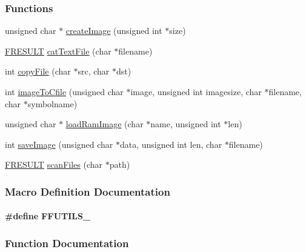 \subsubsection*{Functions}
\begin{DoxyCompactItemize}
\item 
unsigned char $\ast$ \hyperlink{fsutils_8h_af657990c3bb65b3952991fbd104a5e8d}{create\+Image} (unsigned int $\ast$size)
\item 
\hyperlink{ff_8h_a49d0171ecbd362cda5680a0d360db44c}{F\+R\+E\+S\+U\+L\+T} \hyperlink{fsutils_8h_a78db4b553305a7be5e8aa8a6822e69ad}{cat\+Text\+File} (char $\ast$filename)
\item 
int \hyperlink{fsutils_8h_ad5087dce5c2ddc8d9df6a761bc924ee4}{copy\+File} (char $\ast$src, char $\ast$dst)
\item 
int \hyperlink{fsutils_8h_a8ab056df14b6376ec014be9b2f1450e5}{image\+To\+Cfile} (unsigned char $\ast$image, unsigned int imagesize, char $\ast$filename, char $\ast$symbolname)
\item 
unsigned char $\ast$ \hyperlink{fsutils_8h_acece2cee5a5e0b55e2c9471b150c94f4}{load\+Ram\+Image} (char $\ast$name, unsigned int $\ast$len)
\item 
int \hyperlink{fsutils_8h_aa7e2c3eeabf70fdcb65cd67c094b5884}{save\+Image} (unsigned char $\ast$data, unsigned int len, char $\ast$filename)
\item 
\hyperlink{ff_8h_a49d0171ecbd362cda5680a0d360db44c}{F\+R\+E\+S\+U\+L\+T} \hyperlink{fsutils_8h_a7ed47006993e0f16e2f77f981a1eed80}{scan\+Files} (char $\ast$path)
\end{DoxyCompactItemize}


\subsubsection{Macro Definition Documentation}
\paragraph[{F\+F\+U\+T\+I\+L\+S\+\_\+}]{\setlength{\rightskip}{0pt plus 5cm}\#define F\+F\+U\+T\+I\+L\+S\+\_\+}\label{fsutils_8h_ae0f9f379fdea300d0168f89f33f241a6}


\subsubsection{Function Documentation}
